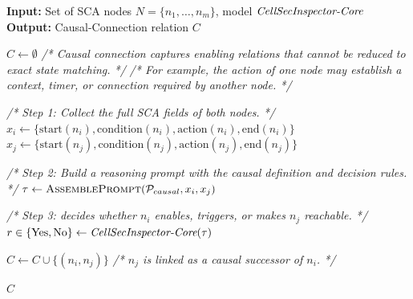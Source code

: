 \begin{algorithm}[ht]
\caption{Causal Connection}
\label{alg:causal_connection}
\scriptsize
\begin{algorithmic}[1]

\State \textbf{Input:} Set of SCA nodes $N=\{n_1,\dots,n_m\}$, model $\textit{CellSecInspector-Core}$
\State \textbf{Output:} Causal-Connection relation $C$

\State $C \leftarrow \emptyset$
\State \textit{/* Causal connection captures enabling relations that cannot be reduced to exact state matching. */}
\State \textit{/* For example, the action of one node may establish a context, timer, or connection required by another node. */}


    \State \textit{/* Step 1: Collect the full SCA fields of both nodes. */}
    \State $x_i \leftarrow \{\text{start}(n_i),\text{condition}(n_i),\text{action}(n_i),\text{end}(n_i)\}$
    \State $x_j \leftarrow \{\text{start}(n_j),\text{condition}(n_j),\text{action}(n_j),\text{end}(n_j)\}$

    \State \textit{/* Step 2: Build a reasoning prompt with the causal definition and decision rules. */}
    \State $\tau \leftarrow \textsc{AssemblePrompt}(\mathcal{P}_{causal}, x_i, x_j)$

    \State \textit{/* Step 3: \core decides whether $n_i$ enables, triggers, or makes $n_j$ reachable. */}
    \State $r \in \{\text{Yes},\text{No}\} \leftarrow \textit{CellSecInspector-Core}(\tau)$

        \State $C \leftarrow C \cup \{(n_i,n_j)\}$
        \State \textit{/* $n_j$ is linked as a causal successor of $n_i$. */}
    \EndIf

\EndFor

\State \Return $C$

\end{algorithmic}
\end{algorithm}

